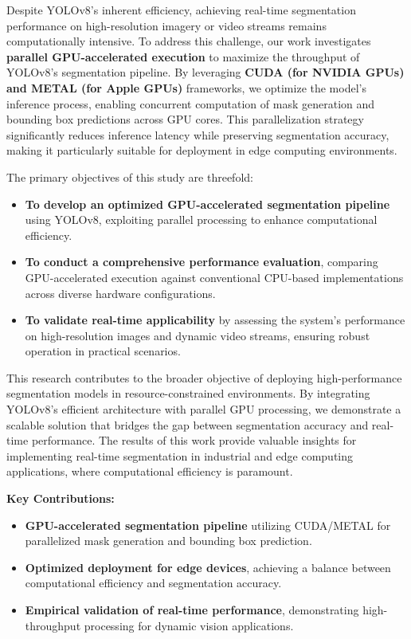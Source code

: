 \documentclass[conference]{IEEEtran}
\begin{document}
Despite YOLOv8's inherent efficiency, achieving real-time segmentation performance on high-resolution imagery or video streams remains computationally intensive. To address this challenge, our work investigates \textbf{parallel GPU-accelerated execution} to maximize the throughput of YOLOv8's segmentation pipeline. By leveraging \textbf{CUDA (for NVIDIA GPUs) and METAL (for Apple GPUs)} frameworks, we optimize the model's inference process, enabling concurrent computation of mask generation and bounding box predictions across GPU cores. This parallelization strategy significantly reduces inference latency while preserving segmentation accuracy, making it particularly suitable for deployment in edge computing environments.

The primary objectives of this study are threefold:
\begin{itemize}
    \item \textbf{To develop an optimized GPU-accelerated segmentation pipeline} using YOLOv8, exploiting parallel processing to enhance computational efficiency.
    \item \textbf{To conduct a comprehensive performance evaluation}, comparing GPU-accelerated execution against conventional CPU-based implementations across diverse hardware configurations.
    \item \textbf{To validate real-time applicability} by assessing the system's performance on high-resolution images and dynamic video streams, ensuring robust operation in practical scenarios.
\end{itemize}

This research contributes to the broader objective of deploying high-performance segmentation models in resource-constrained environments. By integrating YOLOv8's efficient architecture with parallel GPU processing, we demonstrate a scalable solution that bridges the gap between segmentation accuracy and real-time performance. The results of this work provide valuable insights for implementing real-time segmentation in industrial and edge computing applications, where computational efficiency is paramount.

\noindent \textbf{Key Contributions:}
\begin{itemize}
    \item \textbf{GPU-accelerated segmentation pipeline} utilizing CUDA/METAL for parallelized mask generation and bounding box prediction.
    \item \textbf{Optimized deployment for edge devices}, achieving a balance between computational efficiency and segmentation accuracy.
    \item \textbf{Empirical validation of real-time performance}, demonstrating high-throughput processing for dynamic vision applications.
\end{itemize}
\end{document}
